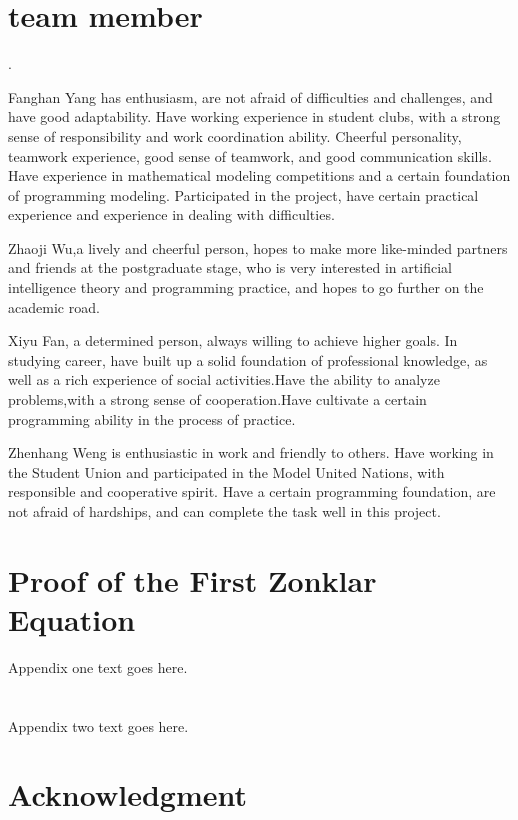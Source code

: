\documentclass[journal]{IEEEtran}
\begin{document}
\section{team member}
.

Fanghan Yang has enthusiasm, are not afraid of difficulties and challenges, and have good adaptability. Have working experience in student clubs, with a strong sense of responsibility and work coordination ability. Cheerful personality, teamwork experience, good sense of teamwork, and good communication skills. Have experience in mathematical modeling competitions and a certain foundation of programming modeling. Participated in the project, have certain practical experience and experience in dealing with difficulties.

Zhaoji Wu,a lively and cheerful person, hopes to make more like-minded partners and friends at the postgraduate stage, who is very interested in artificial intelligence theory and programming practice, and hopes to go further on the academic road.

 

Xiyu Fan, a determined person, always willing to achieve higher goals.
In studying career, have built up a solid foundation of professional knowledge,
as well as a rich experience of social activities.Have the ability to analyze problems,with a strong sense of cooperation.Have cultivate a certain programming ability in the process of practice. 

Zhenhang Weng is enthusiastic in work and friendly to others. Have working in the Student Union and participated in the Model United Nations, with responsible and cooperative spirit. Have a certain programming foundation, are not afraid of hardships, and can complete the task well in this project.

\appendices
\section{Proof of the First Zonklar Equation}
Appendix one text goes here.

\section{}
Appendix two text goes here.


\section*{Acknowledgment}
\end{document}
